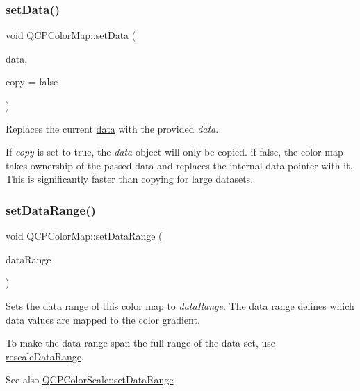 \subsubsection{\texorpdfstring{set\+Data()}{setData()}}
{\footnotesize\ttfamily void Q\+C\+P\+Color\+Map\+::set\+Data (\begin{DoxyParamCaption}\item[{\hyperlink{class_q_c_p_color_map_data}{Q\+C\+P\+Color\+Map\+Data} $\ast$}]{data,  }\item[{bool}]{copy = {\ttfamily false} }\end{DoxyParamCaption})}

Replaces the current \hyperlink{class_q_c_p_color_map_a047d7eb3ae657f93f2f39b5e68b79451}{data} with the provided {\itshape data}.

If {\itshape copy} is set to true, the {\itshape data} object will only be copied. if false, the color map takes ownership of the passed data and replaces the internal data pointer with it. This is significantly faster than copying for large datasets. \hypertarget{class_q_c_p_color_map_a980b42837821159786a85b4b7dcb8774}{}\label{class_q_c_p_color_map_a980b42837821159786a85b4b7dcb8774} 
\subsubsection{\texorpdfstring{set\+Data\+Range()}{setDataRange()}}
{\footnotesize\ttfamily void Q\+C\+P\+Color\+Map\+::set\+Data\+Range (\begin{DoxyParamCaption}\item[{const \hyperlink{class_q_c_p_range}{Q\+C\+P\+Range} \&}]{data\+Range }\end{DoxyParamCaption})}

Sets the data range of this color map to {\itshape data\+Range}. The data range defines which data values are mapped to the color gradient.

To make the data range span the full range of the data set, use \hyperlink{class_q_c_p_color_map_a856608fa3dd1cc290bcd5f29a5575774}{rescale\+Data\+Range}.

\begin{DoxySeeAlso}{See also}
\hyperlink{class_q_c_p_color_scale_abe88633003a26d1e756aa74984587fef}{Q\+C\+P\+Color\+Scale\+::set\+Data\+Range} 
\end{DoxySeeAlso}
\hypertarget{class_q_c_p_color_map_a9d20aa08e3c1f20f22908c45b9c06511}{}\label{class_q_c_p_color_map_a9d20aa08e3c1f20f22908c45b9c06511} 
